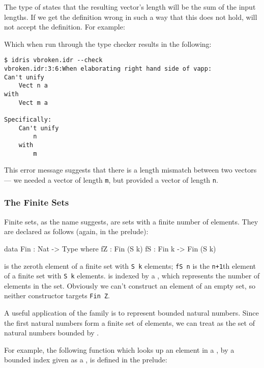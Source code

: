 \noindent
The type of \tFN{(++)} states that the resulting vector's length will be the sum of the input lengths.
If we get the definition wrong in such a way that this does not hold, \Idris{} will not accept the definition.
For example:


\noindent
Which when run through the \Idris{} type checker results in the following:

\begin{lstlisting}[style=stdout]
$ idris vbroken.idr --check
vbroken.idr:3:6:When elaborating right hand side of vapp:
Can't unify
	Vect n a
with
	Vect m a

Specifically:
	Can't unify
		n
	with
		m
\end{lstlisting}

\noindent
This error message suggests that there is a length mismatch between two vectors --- we needed a vector of length \texttt{m}, but provided a vector of length \texttt{n}.


\subsubsection{The Finite Sets}

Finite sets, as the name suggests, are sets with a finite number of elements.
They are declared as follows (again, in the prelude):

\begin{code}
data Fin : Nat -> Type where
   fZ : Fin (S k)
   fS : Fin k -> Fin (S k)
\end{code}

\noindent
{} is the zeroth element of a finite set with \texttt{S k} elements; \texttt{fS n} is the \texttt{n+1}th element of a finite set with \texttt{S k} elements. 
 is indexed by a , which represents the number of elements in the set.
Obviously we can't construct an element of an empty set, so neither constructor targets \texttt{Fin Z}.

A useful application of the  family is to represent bounded natural numbers.
Since the first  natural numbers form a finite set of  elements, we can treat  as the set of natural numbers bounded by . 

For example, the following function which looks up an element in a , by a bounded index given as a , is defined in the prelude:

